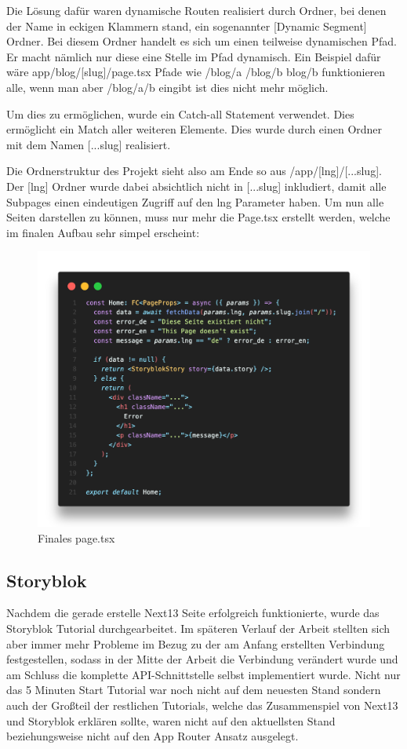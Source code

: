 Die Lösung dafür waren dynamische Routen realisiert durch Ordner, bei denen der Name in eckigen Klammern stand, ein sogenannter [Dynamic Segment] Ordner. Bei diesem Ordner handelt es sich um einen teilweise dynamischen Pfad. Er macht nämlich nur diese eine Stelle im Pfad dynamisch. Ein Beispiel dafür wäre app/blog/[slug]/page.tsx Pfade wie /blog/a /blog/b blog/b funktionieren alle, wenn man aber /blog/a/b eingibt ist dies nicht mehr möglich. 

Um dies zu ermöglichen, wurde ein Catch-all Statement verwendet. Dies ermöglicht ein Match aller weiteren Elemente. Dies wurde durch einen Ordner mit dem Namen [...slug] realisiert.

Die Ordnerstruktur des Projekt sieht also am Ende so aus /app/[lng]/[...slug]. Der [lng] Ordner wurde dabei absichtlich nicht in [...slug] inkludiert, damit alle Subpages einen eindeutigen Zugriff auf den lng Parameter haben. 
Um nun alle Seiten darstellen zu können, muss nur mehr die Page.tsx erstellt werden, welche im finalen Aufbau sehr simpel erscheint:

\begin{figure}[h]
    \centering
    \includegraphics[width=\linewidth]{pics/final-page.png}
    \caption{Finales page.tsx}
\end{figure}

\subsection{Storyblok}
Nachdem die gerade erstelle Next13 Seite erfolgreich funktionierte, wurde das Storyblok Tutorial durchgearbeitet. Im späteren Verlauf der Arbeit stellten sich aber immer mehr Probleme im Bezug zu der am Anfang erstellten Verbindung festgestellen, sodass in der Mitte der Arbeit die Verbindung verändert wurde und am Schluss die komplette API-Schnittstelle selbst implementiert wurde.
Nicht nur das 5 Minuten Start Tutorial war noch nicht auf dem neuesten Stand sondern auch der Großteil der restlichen Tutorials, welche das Zusammenspiel von Next13 und Storyblok erklären sollte,  waren nicht auf den aktuellsten Stand beziehungsweise nicht auf den App Router Ansatz ausgelegt.


